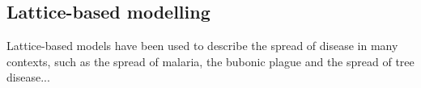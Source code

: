 


%
\subsection{Lattice-based modelling}
Lattice-based models have been used to describe the spread of disease in many contexts, such as the spread of malaria, the bubonic plague and the spread of tree disease...


